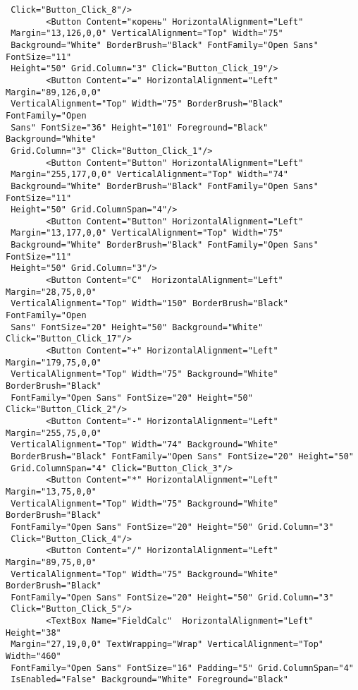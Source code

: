{\begin{verbatim}
 Click="Button_Click_8"/>
        <Button Content="корень" HorizontalAlignment="Left"
 Margin="13,126,0,0" VerticalAlignment="Top" Width="75"
 Background="White" BorderBrush="Black" FontFamily="Open Sans" FontSize="11"
 Height="50" Grid.Column="3" Click="Button_Click_19"/>
        <Button Content="=" HorizontalAlignment="Left" Margin="89,126,0,0"
 VerticalAlignment="Top" Width="75" BorderBrush="Black" FontFamily="Open
 Sans" FontSize="36" Height="101" Foreground="Black" Background="White"
 Grid.Column="3" Click="Button_Click_1"/>
        <Button Content="Button" HorizontalAlignment="Left"
 Margin="255,177,0,0" VerticalAlignment="Top" Width="74"
 Background="White" BorderBrush="Black" FontFamily="Open Sans" FontSize="11"
 Height="50" Grid.ColumnSpan="4"/>
        <Button Content="Button" HorizontalAlignment="Left"
 Margin="13,177,0,0" VerticalAlignment="Top" Width="75"
 Background="White" BorderBrush="Black" FontFamily="Open Sans" FontSize="11"
 Height="50" Grid.Column="3"/>
        <Button Content="C"  HorizontalAlignment="Left" Margin="28,75,0,0"
 VerticalAlignment="Top" Width="150" BorderBrush="Black" FontFamily="Open
 Sans" FontSize="20" Height="50" Background="White" Click="Button_Click_17"/>
        <Button Content="+" HorizontalAlignment="Left" Margin="179,75,0,0"
 VerticalAlignment="Top" Width="75" Background="White" BorderBrush="Black"
 FontFamily="Open Sans" FontSize="20" Height="50" Click="Button_Click_2"/>
        <Button Content="-" HorizontalAlignment="Left" Margin="255,75,0,0"
 VerticalAlignment="Top" Width="74" Background="White"
 BorderBrush="Black" FontFamily="Open Sans" FontSize="20" Height="50"
 Grid.ColumnSpan="4" Click="Button_Click_3"/>
        <Button Content="*" HorizontalAlignment="Left" Margin="13,75,0,0"
 VerticalAlignment="Top" Width="75" Background="White" BorderBrush="Black"
 FontFamily="Open Sans" FontSize="20" Height="50" Grid.Column="3"
 Click="Button_Click_4"/>
        <Button Content="/" HorizontalAlignment="Left" Margin="89,75,0,0"
 VerticalAlignment="Top" Width="75" Background="White" BorderBrush="Black"
 FontFamily="Open Sans" FontSize="20" Height="50" Grid.Column="3"
 Click="Button_Click_5"/>
        <TextBox Name="FieldCalc"  HorizontalAlignment="Left" Height="38"
 Margin="27,19,0,0" TextWrapping="Wrap" VerticalAlignment="Top" Width="460"
 FontFamily="Open Sans" FontSize="16" Padding="5" Grid.ColumnSpan="4"
 IsEnabled="False" Background="White" Foreground="Black"


\end{verbatim}}
